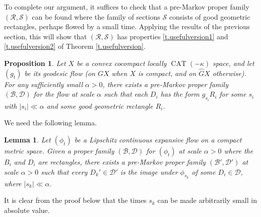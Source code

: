 \documentclass[11pt]{article}
\let\mathcal\mathscr
\newtheorem{lem}[thm]{Lemma}
\newtheorem{prop}[thm]{Proposition}
\theoremstyle{definition}
\numberwithin{equation}{section}
\DeclareMathOperator{\CAT}{CAT}
\newcommand\DDD{\mathcal D}
\newcommand\BBB{\mathcal B}
\newcommand\RRR{\mathcal R}
\newcommand\SSS{\mathcal S}
\begin{document}
To complete our argument, it suffices to check that a pre-Markov proper family $(\RRR, \SSS)$ can be found where the family of sections $\SSS$ consists of good geometric rectangles, perhaps flowed by a small time. Applying the results of the previous section, this will show that $(\RRR, \SSS)$ has properties \eqref{t.usefulversion1} and \eqref{t.usefulversion2} of Theorem \ref{t.usefulversion}.

\begin{prop}\label{prop:good mpf}
Let $X$ be a convex cocompact locally $\CAT(-\kappa)$ space, and let $(g_t)$ be its geodesic flow (on $GX$ when $X$ is compact, and on $\hat GX$ otherwise). For any sufficiently small $\alpha>0$, there exists a pre-Markov proper family $(\BBB, \DDD)$ for the flow at scale $\alpha$ such that each $D_i$ has the form $g_{s_i}R_i$ for some $s_i$ with $|s_i| \ll  \alpha$ and some good geometric rectangle $R_i$.
\end{prop}

We need the following lemma.

\begin{lem} \label{markovpf}
Let $(\phi_t)$ be a Lipschitz continuous expansive flow on a compact metric space. Given a proper family $(\BBB, \DDD)$ for $(\phi_t)$ at scale $\alpha>0$ where the $B_i$ and $D_i$ are rectangles, there exists a pre-Markov proper family $(\BBB', \DDD')$ at scale $\alpha>0$ such that every $D_k'\in\mathcal{D}'$ is the image under $\phi_{s_k}$ of some $D_i\in\mathcal{D}$, where $|s_k| \ll  \alpha$.
\end{lem}

It is clear from the proof below that the times $s_k$ can be made arbitrarily small in absolute value.
\end{document}
